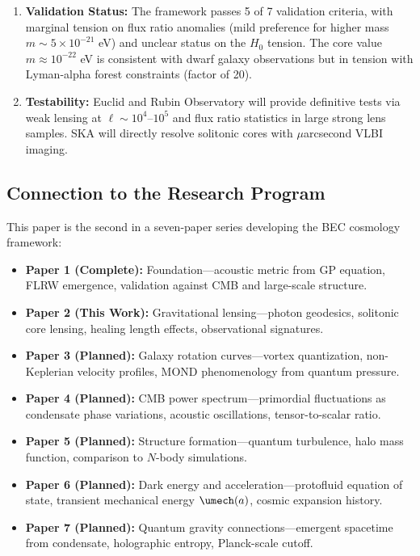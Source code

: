 \documentclass[11pt,a4paper]{article}
\theoremstyle{definition}
\theoremstyle{remark}
\begin{document}
\begin{enumerate}[leftmargin=*, itemsep=0.3em]
\item \textbf{Validation Status:} The framework passes 5 of 7 validation criteria, with marginal tension on flux ratio anomalies (mild preference for higher mass $m \sim 5 \times 10^{-21}$ eV) and unclear status on the $H_0$ tension. The core value $m \approx 10^{-22}$ eV is consistent with dwarf galaxy observations but in tension with Lyman-alpha forest constraints (factor of 20).

\item \textbf{Testability:} Euclid and Rubin Observatory will provide definitive tests via weak lensing at $\ell \sim 10^4$--$10^5$ and flux ratio statistics in large strong lens samples. SKA will directly resolve solitonic cores with $\mu$arcsecond VLBI imaging.

\end{enumerate}

\subsection{Connection to the Research Program}
\label{sec:research_program}

This paper is the second in a seven-paper series developing the BEC cosmology framework:

\begin{itemize}[leftmargin=*, itemsep=0.3em]

\item \textbf{Paper 1 (Complete):} Foundation---acoustic metric from GP equation, FLRW emergence, validation against CMB and large-scale structure.

\item \textbf{Paper 2 (This Work):} Gravitational lensing---photon geodesics, solitonic core lensing, healing length effects, observational signatures.

\item \textbf{Paper 3 (Planned):} Galaxy rotation curves---vortex quantization, non-Keplerian velocity profiles, MOND phenomenology from quantum pressure.

\item \textbf{Paper 4 (Planned):} CMB power spectrum---primordial fluctuations as condensate phase variations, acoustic oscillations, tensor-to-scalar ratio.

\item \textbf{Paper 5 (Planned):} Structure formation---quantum turbulence, halo mass function, comparison to $N$-body simulations.

\item \textbf{Paper 6 (Planned):} Dark energy and acceleration---protofluid equation of state, transient mechanical energy $\umech(a)$, cosmic expansion history.

\item \textbf{Paper 7 (Planned):} Quantum gravity connections---emergent spacetime from condensate, holographic entropy, Planck-scale cutoff.

\end{itemize}
\end{document}

